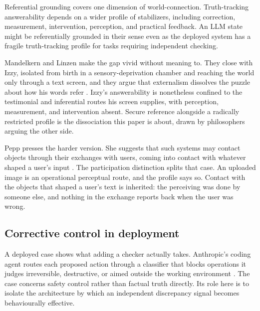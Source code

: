 \documentclass[12pt]{article}
\begin{document}
Referential grounding covers one dimension of world-connection. Truth-tracking answerability
depends on a wider profile of stabilizers, including correction, measurement,
intervention, perception, and practical feedback. An LLM state might be referentially
grounded in their sense even as the deployed system has a fragile truth-tracking profile
for tasks requiring independent checking.

Mandelkern and Linzen make the gap vivid without meaning to. They close with Izzy, isolated from
birth in a sensory-deprivation chamber and reaching the world only through a text screen,
and they argue that externalism dissolves the puzzle about how his words
refer \citep{mandelkern_linzen_2024_do_language_models_words_refer}. Izzy's
answerability is nonetheless confined to the testimonial and inferential routes his screen
supplies, with perception, measurement, and intervention absent. Secure reference
alongside a radically restricted profile is the dissociation this paper is about, drawn by
philosophers arguing the other side.

Pepp presses the harder version. She suggests that such systems may contact objects
through their exchanges with users, coming into contact with whatever shaped a user's
input \citep{pepp_2025_reference_without_intentions_llms}. The participation distinction
splits that case. An uploaded image is an operational perceptual route, and the profile
says so. Contact with the objects that shaped a user's text is inherited: the perceiving
was done by someone else, and nothing in the exchange reports back when the user was
wrong.

\subsection{Corrective control in deployment}\label{ssec:deployment}

A deployed case shows what adding a checker actually takes. Anthropic's coding agent
routes each proposed action through a classifier that blocks operations it judges
irreversible, destructive, or aimed outside the working environment
\citep{anthropic2026automode}. The case concerns safety control rather than factual truth
directly. Its role here is to isolate the architecture by which an independent discrepancy
signal becomes behaviourally effective.
\end{document}
